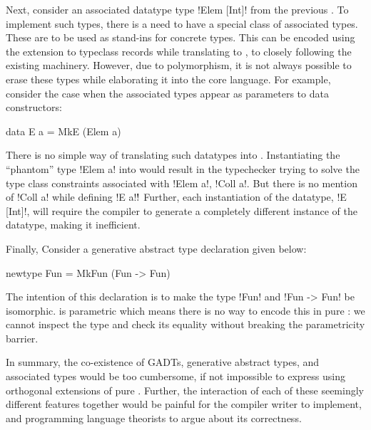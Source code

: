 \documentclass[screen,nonacm,manuscript,review]{acmart} %
\begin{document}
Next, consider an associated datatype type !Elem [Int]! from the
previous . To implement such types, there is a
need to have a special class of associated types. These are to be used
as stand-ins for concrete types. This can be encoded
using the extension to typeclass records while translating to \SF,
to closely following the existing machinery. However, due to
polymorphism, it is not always possible to erase these types while
elaborating it into the core language. For example,
consider the case when the associated types appear as parameters to
data constructors:

\begin{CenteredBox}
\begin{code}
data E a = MkE (Elem a)
\end{code}
\end{CenteredBox}

There is no simple way of translating such datatypes into \SF.
Instantiating the ``phantom'' type !Elem a! into \SF would result in
the typechecker trying to solve the type class constraints associated
with !Elem a!, !Coll a!. But there is no mention of !Coll a! while
defining !E a!$!$ Further, each instantiation of the
datatype, !E [Int]!, will require the compiler to generate a
completely different instance of the datatype, making it
inefficient.

Finally, Consider a generative abstract type declaration given below:

\begin{CenteredBox}
\begin{code}
newtype Fun = MkFun (Fun -> Fun)
\end{code}
\end{CenteredBox}
The intention of this declaration is to make the type !Fun!
and !Fun -> Fun! be isomorphic. \SF is parametric which means
there is no way to encode this in pure \SF: we cannot inspect the type
and check its equality without breaking the parametricity barrier.

In summary, the co-existence of GADTs, generative abstract
types, and associated types would be too cumbersome, if not impossible
to express using orthogonal extensions of pure \SF. Further, the
interaction of each of these seemingly different features together would
be painful for the compiler writer to implement, and programming
language theorists to argue about its correctness.
\end{document}
